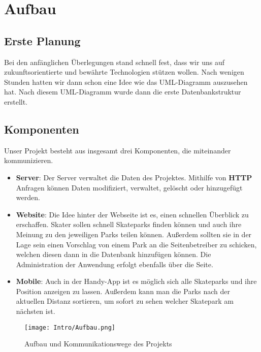 \chapter{Aufbau}

\section{Erste Planung}
Bei den anfänglichen Überlegungen stand schnell fest, dass wir uns auf zukunftsorientierte und bewährte Technologien
stützen wollen. Nach wenigen Stunden hatten wir dann schon eine Idee wie das
UML-Diagramm auszusehen hat. Nach diesem UML-Diagramm wurde dann die erste Datenbankstruktur erstellt.

\section{Komponenten}
Unser Projekt besteht aus insgesamt drei Komponenten, die miteinander kommunizieren.

\begin{itemize}
  \item \textbf{Server}: Der Server verwaltet die Daten des Projektes. Mithilfe von \textbf{HTTP}
        Anfragen können Daten modifiziert, verwaltet, gelöscht oder hinzugefügt werden.

  \item \textbf{Website}: Die Idee hinter der Webseite ist es, einen schnellen Überblick zu
        erschaffen. Skater sollen schnell Skateparks finden können und auch ihre Meinung zu den
        jeweiligen Parks teilen können. Außerdem sollten sie in der Lage sein einen Vorschlag von einem
        Park an die Seitenbetreiber zu schicken, welchen diesen dann in die Datenbank hinzufügen können.
        Die Administration der Anwendung erfolgt ebenfalls über die Seite.

  \item \textbf{Mobile}: Auch in der Handy-App ist es möglich sich alle Skateparks und ihre
        Position anzeigen zu lassen. Außerdem kann man die Parks nach der aktuellen Distanz sortieren,
        um sofort zu sehen welcher Skatepark am nächsten ist.
\end{itemize}

\begin{figure}[H]
  \begin{center}
    \texttt{[image: Intro/Aufbau.png]}
    \caption{Aufbau und Kommunikationswege des Projekts}
  \end{center}
\end{figure}

